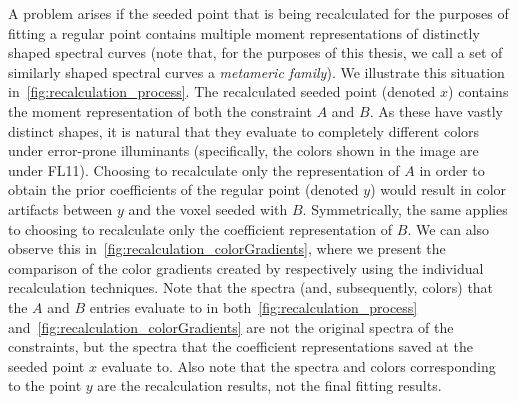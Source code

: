 A problem arises if the seeded point that is being recalculated for the purposes of fitting a regular point contains multiple moment representations of distinctly shaped spectral curves (note that, for the purposes of this thesis, we call a set of similarly shaped spectral curves a \emph{metameric family}). We illustrate this situation in~\cref{fig:recalculation_process}. The recalculated seeded point (denoted $x$) contains the moment representation of both the constraint $A$ and $B$. As these have vastly distinct shapes, it is natural that they evaluate to completely different colors under error-prone illuminants (specifically, the colors shown in the image are under FL11). Choosing to recalculate only the representation of $A$ in order to obtain the prior coefficients of the regular point (denoted $y$) would result in color artifacts between $y$ and the voxel seeded with $B$. Symmetrically, the same applies to choosing to recalculate only the coefficient representation of $B$. We can also observe this in~\cref{fig:recalculation_colorGradients}, where we present the comparison of the color gradients created by respectively using the individual recalculation techniques. Note that the spectra (and, subsequently, colors) that the $A$ and $B$ entries evaluate to in both~\cref{fig:recalculation_process} and~\cref{fig:recalculation_colorGradients} are not the original spectra of the constraints, but the spectra that the coefficient representations saved at the seeded point $x$ evaluate to. Also note that the spectra and colors corresponding to the point $y$ are the recalculation results, not the final fitting results.

